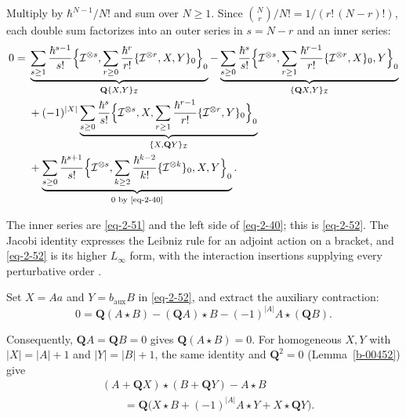 \documentclass[11pt]{article}
\numberwithin{equation}{section}
\numberwithin{figure}{section}
\numberwithin{table}{section}
\begin{document}
Multiply by $\hbar^{N-1}/N!$ and sum over $N\ge1$. Since $\binom Nr/N!=1/(r!\,(N-r)!)$, each double sum factorizes into an outer series in $s=N-r$ and an inner series:
\begin{equation}\label{eq-quadratic-two-summed}
\begin{aligned}
0={}&\underbrace{\sum_{s\ge1}\frac{\hbar^{s-1}}{s!}\Big\{\mathcal I^{\otimes s},\sum_{r\ge0}\frac{\hbar^r}{r!}\{\mathcal I^{\otimes r},X,Y\}_0\Big\}_0}_{\mathbf Q\{X,Y\}_{\mathcal I}}
-\underbrace{\sum_{s\ge0}\frac{\hbar^{s}}{s!}\Big\{\mathcal I^{\otimes s},\sum_{r\ge1}\frac{\hbar^{r-1}}{r!}\{\mathcal I^{\otimes r},X\}_0,Y\Big\}_0}_{\{\mathbf QX,Y\}_{\mathcal I}}\\
&+(-1)^{|X|}\underbrace{\sum_{s\ge0}\frac{\hbar^{s}}{s!}\Big\{\mathcal I^{\otimes s},X,\sum_{r\ge1}\frac{\hbar^{r-1}}{r!}\{\mathcal I^{\otimes r},Y\}_0\Big\}_0}_{\{X,\mathbf QY\}_{\mathcal I}}\\
&+\underbrace{\sum_{s\ge0}\frac{\hbar^{s+1}}{s!}\Big\{\mathcal I^{\otimes s},\sum_{k\ge2}\frac{\hbar^{k-2}}{k!}\{\mathcal I^{\otimes k}\}_0,X,Y\Big\}_0}_{0\text{ by \eqref{eq-2-40}}}.
\end{aligned}
\end{equation}

The inner series are \eqref{eq-2-51} and the left side of \eqref{eq-2-40}; this is \eqref{eq-2-52}. The Jacobi identity expresses the Leibniz rule for an adjoint action on a bracket, and \eqref{eq-2-52} is its higher $L_\infty$ form, with the interaction insertions supplying every perturbative order \cite[Sections 4.3--4.5]{higher}.

Set $X=Aa$ and $Y=b_{\mathrm{aux}}B$ in \eqref{eq-2-52}, and extract the auxiliary contraction:
\begin{equation*}
0=\mathbf Q(A\star B)
-(\mathbf QA)\star B-(-1)^{|A|}A\star(\mathbf QB).
\end{equation*}

Consequently, $\mathbf QA=\mathbf QB=0$ gives $\mathbf Q(A\star B)=0$. For homogeneous $X,Y$ with $|X|=|A|+1$ and $|Y|=|B|+1$, the same identity and $\mathbf Q^2=0$ (Lemma~\ref{b-00452}) give
\begin{equation}\label{eq-representatives}
\begin{aligned}
&(A+\mathbf QX)\star(B+\mathbf QY)-A\star B\\
&\qquad=\mathbf Q\bigl(X\star B+(-1)^{|A|}A\star Y
+X\star\mathbf QY\bigr).
\end{aligned}
\end{equation}
\end{document}
